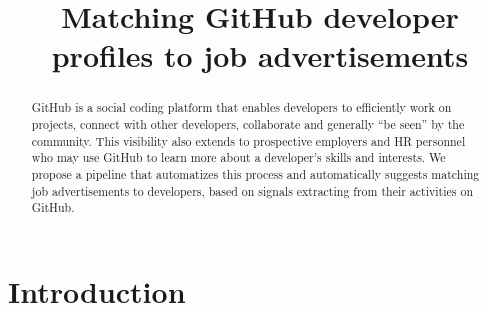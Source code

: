 \documentclass[conference]{IEEEtran}
\begin{document}
\newcommand{\ghtorrent}{ \textsc{ght}orrent\xspace}
\newcommand{\api}{\textsc{api}\xspace}

\newcommand{\nb}[3]{
  \fcolorbox{black}{#2}{\bfseries\sffamily\scriptsize#1}
    {\sf\small$\blacktriangleright$\textit{#3}$\blacktriangleleft$}
}

\newcommand\georgios[1]{\nb{Georgios}{yellow}{#1}}
\newcommand\alberto[1]{\nb{Claudia}{cyan}{#1}}


\newcommand{\hassanbox}[1]
{
  \vspace{0.29em}
  \noindent
  \fbox{
  \begin{minipage}{0.46\textwidth}
    \emph{\noindent #1}
    \end{minipage}
}}

\newcommand{\resp}[2]{{\sc R#1:} ``\emph{#2}''}
\newcommand{\respnum}[1]{{\sc R#1}}
\newcommand{\code}[1]{{\textsl{#1}}}

\title{Matching GitHub developer profiles to job advertisements}

\author{
\and
{}
}

\maketitle

\begin{abstract}
GitHub is a social coding platform that enables developers to efficiently work on projects, connect with other developers, collaborate and generally ``be seen'' by the community. This visibility also extends to prospective employers and HR personnel who may use GitHub to learn more about a developer's skills and interests. We propose a pipeline that automatizes this process and automatically suggests matching job advertisements to developers, based on signals extracting from their activities on GitHub.
\end{abstract}


\section{Introduction}
\end{document}
